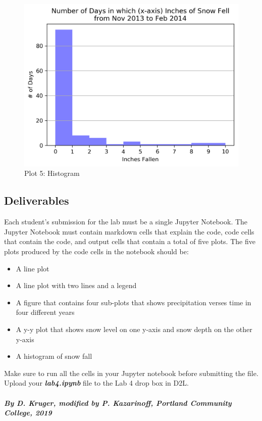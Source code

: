 \documentclass[11pt]{article}
\makeatletter
\def\maxwidth{\ifdim\Gin@nat@width>\linewidth\linewidth
    \else\Gin@nat@width\fi}
\let\Oldincludegraphics\includegraphics
\renewcommand{\includegraphics}[1]{\Oldincludegraphics[width=.8\maxwidth]{#1}}
\makeatother
\begin{document}
\begin{figure}[h!]
\centering
\includegraphics{images/plot5.png}
\caption{Plot 5: Histogram}
\end{figure}

    \hypertarget{deliverables}{%
\subsection{Deliverables}\label{deliverables}}

Each student's submission for the lab must be a single Jupyter Notebook.
The Jupyter Notebook must contain markdown cells that explain the code,
code cells that contain the code, and output cells that contain a total
of five plots. The five plots produced by the code cells in the notebook
should be:

\begin{itemize}
\item
  A line plot
\item
  A line plot with two lines and a legend
\item
  A figure that contains four sub-plots that shows precipitation verses
  time in four different years
\item
  A y-y plot that shows snow level on one y-axis and snow depth on the
  other y-axis
\item
  A histogram of snow fall
\end{itemize}

Make sure to run all the cells in your Jupyter notebook before
submitting the file. Upload your \textbf{\emph{lab4.ipynb}} file to the
Lab 4 drop box in D2L.

    \hypertarget{by-d.-kruger-modified-by-p.-kazarinoff-portland-community-college-2019}{%
\paragraph{\texorpdfstring{\emph{By D. Kruger, modified by P.
Kazarinoff, Portland Community College,
2019}}{By D. Kruger, modified by P. Kazarinoff, Portland Community College, 2019}}\label{by-d.-kruger-modified-by-p.-kazarinoff-portland-community-college-2019}}


    
    
    
    
\end{document}
